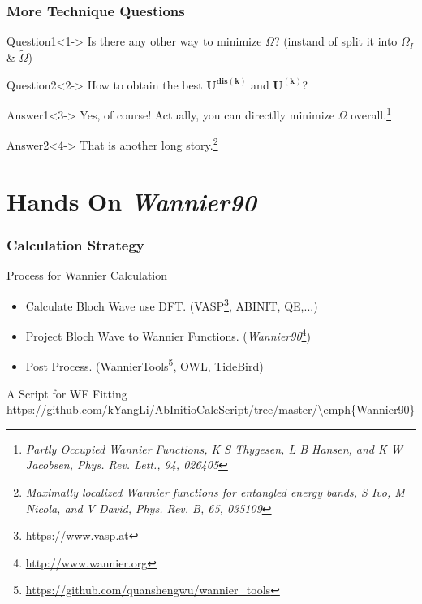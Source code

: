 \documentclass{beamer}
\begin{document}
  \begin{frame}
    \frametitle{More Technique Questions}
    \begin{alertblock}{Question1}<1->
      Is there any other way to minimize \(\Omega\)? (instand of split it into \(\Omega_I\) \& \(\widetilde{\Omega}\))
    \end{alertblock}


    \begin{alertblock}{Question2}<2->
      How to obtain the best \(\mathbf{U^{dis(\mathbf{k})}}\) and \(\mathbf{U^{(\mathbf{k})}}\)?
    \end{alertblock}

    \begin{block}{Answer1}<3->
      Yes, of course! Actually, you can directlly minimize \(\Omega\) overall.\footnote{\tiny\emph{Partly Occupied Wannier Functions, K S Thygesen, L B Hansen, and K W Jacobsen, Phys. Rev. Lett., 94, 026405}}
    \end{block}

    \begin{block}{Answer2}<4->
      That is another long story.\footnote{\tiny\emph{Maximally localized Wannier functions for entangled energy bands, S Ivo, M Nicola, and V David, Phys. Rev. B, 65, 035109}}
    \end{block}

  \end{frame}

  \section{Hands On \emph{Wannier90}}
  
  \begin{frame}
    \frametitle{Calculation Strategy}
    \begin{block}{Process for Wannier Calculation}
      \begin{itemize}
        \item Calculate Bloch Wave use DFT. (VASP\footnote{\url{https://www.vasp.at}}, ABINIT, QE,...)
        \item Project Bloch Wave to Wannier Functions. (\emph{Wannier90}\footnote{\url{http://www.wannier.org}})
        \item Post Process. (WannierTools\footnote{\url{https://github.com/quanshengwu/wannier_tools}}, OWL, TideBird)
      \end{itemize}      
    \end{block}

    \begin{block}{A Script for WF Fitting}
      \url{https://github.com/kYangLi/AbInitioCalcScript/tree/master/\emph{Wannier90}}
    \end{block}

  \end{frame}
\end{document}
